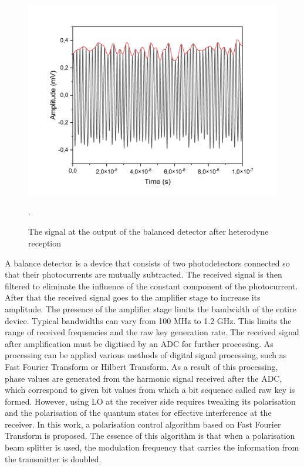 {\begin{figure}
    \centering
    \includegraphics[width=\textwidth]{images/balanced output heterodyne.png}
    \caption{The signal at the output of the balanced detector after heterodyne reception}.
    \label{fig:het time output syn}
\end{figure}
\newline A balance detector is a device that consists of two photodetectors connected so that their photocurrents are mutually subtracted. The received signal is then filtered to eliminate the influence of the constant component of the photocurrent. After that the received signal goes to the amplifier stage to increase its amplitude. The presence of the amplifier stage limits the bandwidth of the entire device. Typical bandwidths can vary from 100 MHz to 1.2 GHz. This limits the range of received frequencies and the raw key generation rate. 
\newline The received signal after amplification must be digitised by an ADC for further processing. As processing can be applied various methods of digital signal processing, such as Fast Fourier Transform or Hilbert Transform. As a result of this processing, phase values are generated from the harmonic signal received after the ADC, which correspond to given bit values from which a bit sequence called raw key is formed. 
However, using LO at the receiver side requires tweaking its polarisation and the polarisation of the quantum states for effective interference at the receiver. In this work, a polarisation control algorithm based on Fast Fourier Transform is proposed. The essence of this algorithm is that when a polarisation beam splitter is used, the modulation frequency that carries the information from the transmitter is doubled.
}
